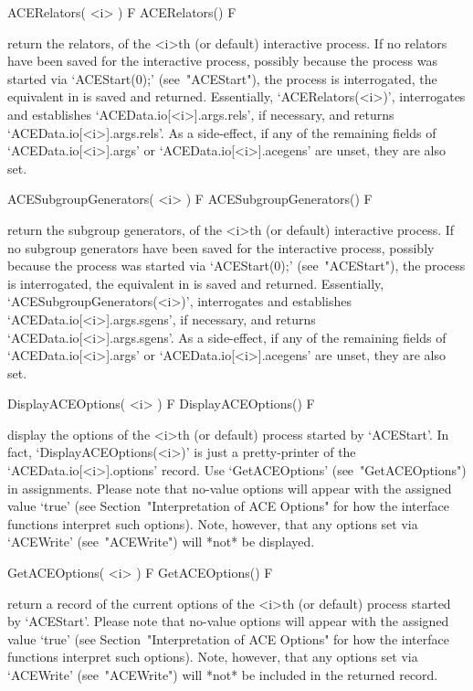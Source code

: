 \>ACERelators( <i> ) F
\>ACERelators() F

return the {\GAP} relators, of  the  <i>th  (or  default)  interactive
{\ACE} process. If no relators have been  saved  for  the  interactive
{\ACE}  process,  possibly  because  the  process  was   started   via
`ACEStart(0);' (see~"ACEStart"), the {\ACE} process  is  interrogated,
the  equivalent  in  {\GAP}  is  saved  and   returned.   Essentially,
`ACERelators(<i>)',    interrogates     {\ACE}     and     establishes
`ACEData.io[<i>].args.rels',     if     necessary,     and     returns
`ACEData.io[<i>].args.rels'. As a side-effect, if any of the remaining
fields  of  `ACEData.io[<i>].args'  or  `ACEData.io[<i>].acegens'  are
unset, they are also set.

\>ACESubgroupGenerators( <i> ) F
\>ACESubgroupGenerators() F

return the {\GAP} subgroup  generators,  of  the  <i>th  (or  default)
interactive {\ACE} process. If no subgroup generators have been  saved
for the interactive {\ACE} process, possibly because the  process  was
started via `ACEStart(0);' (see~"ACEStart"),  the  {\ACE}  process  is
interrogated,  the  equivalent  in  {\GAP}  is  saved  and   returned.
Essentially,  `ACESubgroupGenerators(<i>)',  interrogates  {\ACE}  and
establishes `ACEData.io[<i>].args.sgens', if  necessary,  and  returns
`ACEData.io[<i>].args.sgens'.  As  a  side-effect,  if  any   of   the
remaining       fields       of       `ACEData.io[<i>].args'        or
`ACEData.io[<i>].acegens' are unset, they are also set.

\>DisplayACEOptions( <i> ) F
\>DisplayACEOptions() F

display the options of the  <i>th  (or  default)  process  started  by
`ACEStart'. In fact, `DisplayACEOptions(<i>)' is just a pretty-printer
of   the   `ACEData.io[<i>].options'   record.   Use   `GetACEOptions'
(see~"GetACEOptions") in assignments. Please note that no-value {\ACE}
options  will   appear   with   the   assigned   value   `true'   (see
Section~"Interpretation of ACE Options" for how the  {\ACE}  interface
functions interpret such options). Note, however, that any options set
via `ACEWrite' (see~"ACEWrite") will *not* be displayed.

\>GetACEOptions( <i> ) F
\>GetACEOptions() F

return a record of the current  options  of  the  <i>th  (or  default)
process started  by  `ACEStart'.  Please  note  that  no-value  {\ACE}
options  will   appear   with   the   assigned   value   `true'   (see
Section~"Interpretation of ACE Options" for how the  {\ACE}  interface
functions interpret such options). Note, however, that any options set
via `ACEWrite' (see~"ACEWrite") will *not* be included in the returned
record.

